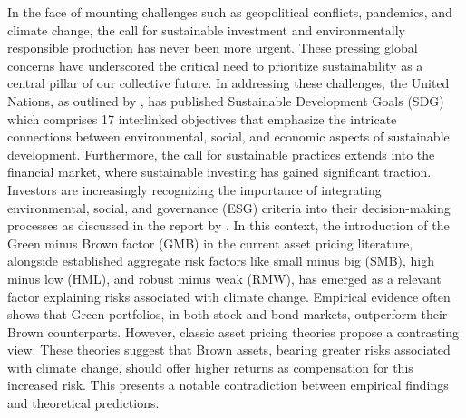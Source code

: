 \documentclass[12pt]{article}
\begin{document}
In the face of mounting challenges such as geopolitical conflicts, pandemics, and climate change, the call for sustainable investment and environmentally responsible production has never been more urgent. These pressing global concerns have underscored the critical need to prioritize sustainability as a central pillar of our collective future. In addressing these challenges, the United Nations, as outlined by \cite{fund2015sustainable}, has published Sustainable Development Goals (SDG) which comprises 17 interlinked objectives that emphasize the intricate connections between environmental, social, and economic aspects of sustainable development. Furthermore, the call for sustainable practices extends into the financial market, where sustainable investing has gained significant traction. Investors are increasingly recognizing the importance of integrating environmental, social, and governance (ESG) criteria into their decision-making processes as discussed in the report by \citet{BNPParibas2023}. In this context, the introduction of the Green minus Brown factor (GMB) in the current asset pricing literature, alongside established aggregate risk factors like small minus big (SMB), high minus low (HML), and robust minus weak (RMW), has emerged as a relevant factor explaining risks associated with climate change. Empirical evidence often shows that Green portfolios, in both stock and bond markets, outperform their Brown counterparts. However, classic asset pricing theories propose a contrasting view. These theories suggest that Brown assets, bearing greater risks associated with climate change, should offer higher returns as compensation for this increased risk. This presents a notable contradiction between empirical findings and theoretical predictions.
\end{document}
